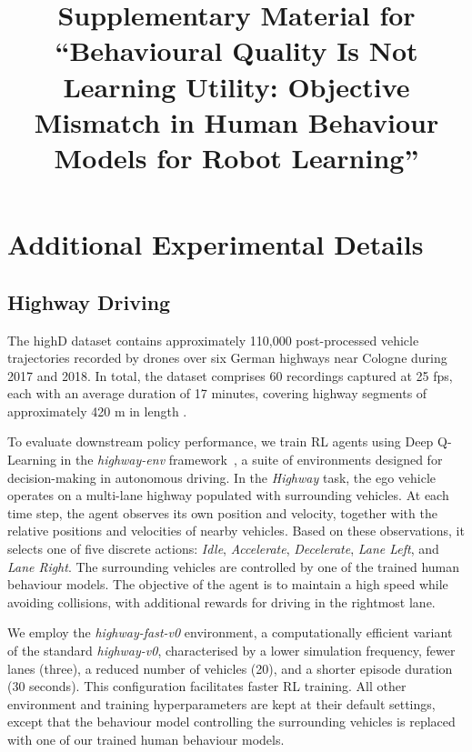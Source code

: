 \documentclass[journal]{IEEEtran}
\begin{document}
\onecolumn
\title{Supplementary Material for\\
``Behavioural Quality Is Not Learning Utility: Objective Mismatch in Human Behaviour Models for Robot Learning''}
\maketitle

\tableofcontents
\clearpage
\twocolumn

\section{Additional Experimental Details}

\subsection{Highway Driving}

The highD dataset contains approximately 110,000 post-processed vehicle trajectories recorded by drones over six German highways near Cologne during 2017 and 2018. In total, the dataset comprises 60 recordings captured at 25 fps, each with an average duration of 17 minutes, covering highway segments of approximately 420 m in length \cite{highDdataset}.

To evaluate downstream policy performance, we train RL agents using Deep Q-Learning in the \textit{highway-env} framework~\cite{highway-env}, a suite of environments designed for decision-making in autonomous driving. In the \textit{Highway} task, the ego vehicle operates on a multi-lane highway populated with surrounding vehicles. At each time step, the agent observes its own position and velocity, together with the relative positions and velocities of nearby vehicles. Based on these observations, it selects one of five discrete actions: \textit{Idle}, \textit{Accelerate}, \textit{Decelerate}, \textit{Lane Left}, and \textit{Lane Right}. The surrounding vehicles are controlled by one of the trained human behaviour models. The objective of the agent is to maintain a high speed while avoiding collisions, with additional rewards for driving in the rightmost lane.

We employ the \textit{highway-fast-v0} environment, a computationally efficient variant of the standard \textit{highway-v0}, characterised by a lower simulation frequency, fewer lanes (three), a reduced number of vehicles (20), and a shorter episode duration (30 seconds). This configuration facilitates faster RL training. All other environment and training hyperparameters are kept at their default settings, except that the behaviour model controlling the surrounding vehicles is replaced with one of our trained human behaviour models.
\end{document}
